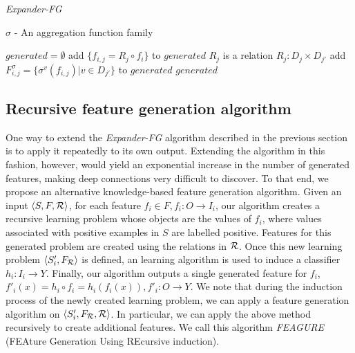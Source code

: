 \documentclass[twoside,11pt]{article}
\theoremstyle{definition}
\begin{document}
\begin{algorithm}[H]
	\caption{\emph{Expander-FG}}
	\label{code-compete}
	\small
	$\sigma$ - An aggregation function family
	\begin{algorithmic}
		\State $generated=\emptyset$
		\State add $\{f_{i,j}=R_j\circ f_i\}$ to $generated$
		\Else \Comment $R_j$ is a relation $R_j:D_j\times D_{j'}$
		\State add $F^\sigma_{i,j}=\{\sigma^v(f_{i,j})|v\in D_{j'}\}$ to $generated$
		\EndIf
		\EndFor
		\EndFor
		\State \Return $generated$ 
		\EndFunction
		
	\end{algorithmic}
\end{algorithm}

\subsection{Recursive feature generation algorithm}
\label{algorithm_section}
One way to extend the \emph{Expander-FG} algorithm described in the previous section is to apply it repeatedly to its own output.
Extending the algorithm in this fashion, however, would yield an exponential increase in the number of generated features, making deep connections very difficult to discover.
To that end, we propose an alternative knowledge-based feature generation algorithm. Given an input $\langle S,F,{\cal R} \rangle$, for each feature $f_i\in F, f_i:O\rightarrow I_i$, our algorithm creates a recursive learning problem whose objects are the values of $f_i$, where values associated with positive examples in $S$ are labelled positive. %
Features for this generated problem are created using the relations in ${\cal R}$. Once this new learning problem $\langle S'_i,F_{\cal R}\rangle$ is defined, an learning algorithm is used to induce a classifier $h_i:I_i\rightarrow Y$. Finally, our algorithm outputs a single generated feature for $f_i$, $f'_i(x)=h_i\circ f_i=h_i(f_i(x)), f'_i:O\rightarrow Y$.
We note that during the induction process of the newly created learning problem, we can apply a feature generation algorithm on $\langle S'_i,F_{\cal R},{\cal R} \rangle$. In particular, we can apply the above method recursively to create additional features. We call this algorithm \emph{FEAGURE} (FEAture Generation Using REcursive induction).
\end{document}
